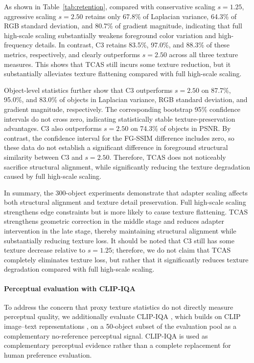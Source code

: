 \documentclass[times,twocolumn,final]{elsarticle}
\begin{document}
As shown in Table~\ref{tab:retention}, compared with conservative scaling $s = 1.25$, aggressive scaling $s = 2.50$ retains only 67.8\% of Laplacian variance, 64.3\% of RGB standard deviation, and 80.7\% of gradient magnitude, indicating that full high-scale scaling substantially weakens foreground color variation and high-frequency details. In contrast, C3 retains 83.5\%, 97.0\%, and 88.3\% of these metrics, respectively, and clearly outperforms $s = 2.50$ across all three texture measures. This shows that TCAS still incurs some texture reduction, but it substantially alleviates texture flattening compared with full high-scale scaling.

Object-level statistics further show that C3 outperforms $s = 2.50$ on 87.7\%, 95.0\%, and 83.0\% of objects in Laplacian variance, RGB standard deviation, and gradient magnitude, respectively. The corresponding bootstrap 95\% confidence intervals do not cross zero, indicating statistically stable texture-preservation advantages. C3 also outperforms $s = 2.50$ on 74.3\% of objects in PSNR. By contrast, the confidence interval for the FG-SSIM difference includes zero, so these data do not establish a significant difference in foreground structural similarity between C3 and $s = 2.50$. Therefore, TCAS does not noticeably sacrifice structural alignment, while significantly reducing the texture degradation caused by full high-scale scaling.

In summary, the 300-object experiments demonstrate that adapter scaling affects both structural alignment and texture detail preservation. Full high-scale scaling strengthens edge constraints but is more likely to cause texture flattening. TCAS strengthens geometric correction in the middle stage and reduces adapter intervention in the late stage, thereby maintaining structural alignment while substantially reducing texture loss. It should be noted that C3 still has some texture decrease relative to $s = 1.25$; therefore, we do not claim that TCAS completely eliminates texture loss, but rather that it significantly reduces texture degradation compared with full high-scale scaling.

\paragraph{Perceptual evaluation with CLIP-IQA}
To address the concern that proxy texture statistics do not directly measure perceptual quality, we additionally evaluate CLIP-IQA \cite{wang2023clipiqa}, which builds on CLIP image--text representations \cite{radford2021clip}, on a 50-object subset of the evaluation pool as a complementary no-reference perceptual signal. CLIP-IQA is used as complementary perceptual evidence rather than a complete replacement for human preference evaluation.
\end{document}
